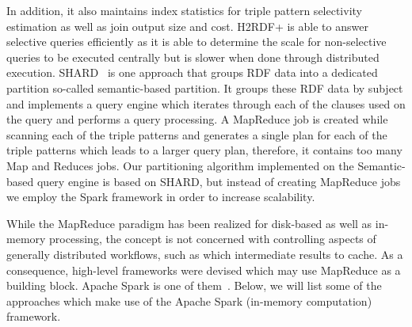 In addition, it also maintains index statistics for triple pattern selectivity estimation as well as join output size and cost.
H2RDF+ is able to answer selective queries efficiently as it is able to determine the scale for non-selective queries to be executed centrally but is slower when done through distributed execution.
SHARD~\cite{Rohloff2010SHARD} is one approach that groups \gls{RDF} data into a dedicated partition so-called semantic-based partition.  
It groups these \gls{RDF} data by subject and implements a query engine which iterates through each of the clauses used on the query and performs a query processing. 
A MapReduce job is created while scanning each of the triple patterns and generates a single plan for each of the triple patterns which leads to a larger query plan, therefore, it contains too many Map and Reduces jobs. 
Our partitioning algorithm implemented on the Semantic-based query engine is based on SHARD, but instead of creating MapReduce jobs we employ the Spark framework in order to increase scalability.

While the MapReduce paradigm has been realized for disk-based as well as in-memory processing, the concept is not concerned with controlling aspects of generally distributed workflows, such as which intermediate results to cache. 
As a consequence, high-level frameworks were devised which may use MapReduce as a building block.
Apache Spark is one of them~\cite{zaharia2012resilient}.
Below, we will list some of the approaches which make use of the Apache Spark (in-memory computation) framework.

